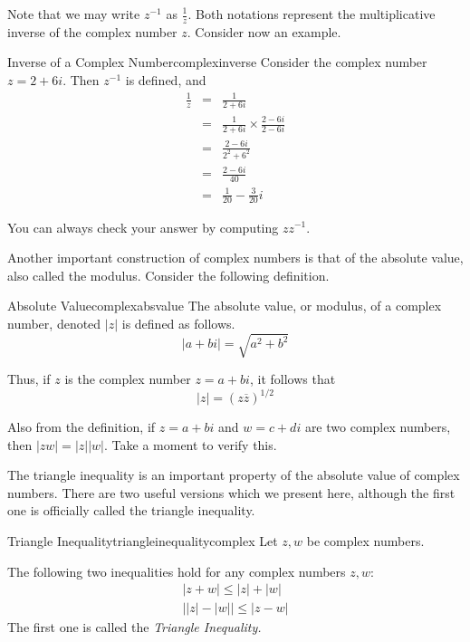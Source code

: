 Note that we may write $z^{-1}$ as $\frac{1}{z}$. Both notations represent the multiplicative inverse of the complex number $z$. Consider now an example.

\begin{example}{Inverse of a Complex Number}{complexinverse}
Consider the complex number $z = 2 + 6i$. Then $z^{-1}$ is defined, and
\begin{eqnarray*}
 \frac{1}{z} &=& \frac{1}{2+6i}\\
 &=& \frac{1}{2+6i}\times \frac{2-6i}{2-6i} \\
 &=& \frac{2-6i}{2^2+6^2} \\
 &=& \frac{2-6i}{40} \\
 &=& \frac{1}{20} -  \frac{3}{20}i
\end{eqnarray*}

You can always check your answer by computing $zz^{-1}$.
\end{example}

Another important construction of complex numbers is that of the absolute value, also called the modulus. Consider the following definition. 

\begin{definition}{Absolute Value}{complexabsvalue}
The absolute
value, or modulus, of a complex number, denoted $\left| z \right|$ is defined as follows.
\begin{equation*}
\left| a+bi\right| =
\sqrt{a^{2}+b^{2}}
\end{equation*}
\end{definition}

Thus, if $z$ is the complex number $z=a+bi$, it follows that
\begin{equation*}
\left| z\right| =\left( z\overline{z}\right) ^{1/2}
\end{equation*}

Also from the definition, if $z=a+bi$ and $w=c+di$ are two complex numbers,
then $\left\vert zw\right\vert =\left\vert z\right\vert \left\vert
w\right\vert .$ Take a moment to verify this.

The triangle inequality
 is an important property of the absolute value
of complex numbers. There are two useful versions which we present
here, although the first one is officially called the triangle inequality. 

\begin{proposition}{Triangle Inequality}{triangleinequalitycomplex}
Let $z,w$ be complex numbers. 

The following two inequalities hold for any  complex numbers $z,w$:
\begin{equation*}
\begin{array}{l}
\left| z+w\right| \leq \left| z\right| +\left| w\right|  \\
\left| \left| z\right| -\left| w\right| \right| \leq \left| z-w\right| 
\end{array}
\end{equation*}
The first one is called the \em{Triangle Inequality}.
\end{proposition}

